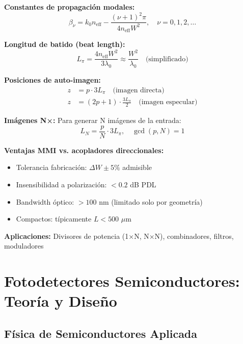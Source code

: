 \documentclass[11pt,a4paper]{article}
\begin{document}
\textbf{Constantes de propagación modales:}
\begin{equation}
    \beta_\nu = k_0 n_{\text{eff}} - \frac{(\nu+1)^2\pi}{4n_{\text{eff}}W^2}, \quad \nu = 0, 1, 2, \ldots
\end{equation}

\textbf{Longitud de batido (beat length):}
\begin{equation}
    L_\pi = \frac{4n_{\text{eff}}W^2}{3\lambda_0} \approx \frac{W^2}{\lambda_0} \quad \text{(simplificado)}
\end{equation}

\textbf{Posiciones de auto-imagen:}
\begin{align}
    z &= p \cdot 3L_\pi \quad \text{(imagen directa)} \\
    z &= (2p+1) \cdot \frac{3L_\pi}{2} \quad \text{(imagen especular)}
\end{align}

\textbf{Imágenes N×:}
Para generar N imágenes de la entrada:
\begin{equation}
    L_{N} = \frac{p}{N} \cdot 3L_\pi, \quad \gcd(p, N) = 1
\end{equation}

\begin{importante}
\textbf{Ventajas MMI vs. acopladores direccionales:}
\begin{itemize}
    \item Tolerancia fabricación: $\Delta W \pm 5\%$ admisible
    \item Insensibilidad a polarización: $< 0.2$ dB PDL
    \item Bandwidth óptico: $> 100$ nm (limitado solo por geometría)
    \item Compactos: típicamente $L < 500$ $\mu$m
\end{itemize}
\textbf{Aplicaciones:} Divisores de potencia (1×N, N×N), combinadores, filtros, moduladores
\end{importante}

\section{Fotodetectores Semiconductores: Teoría y Diseño}

\subsection{Física de Semiconductores Aplicada}
\end{document}
